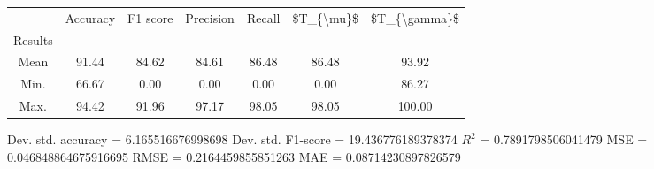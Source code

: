 \begin{tabular}{|c|c|c|c|c|c|c|}
\toprule
{} &  Accuracy &  F1 score &  Precision &  Recall &  \$T\_\{\textbackslash mu\}\$ &  \$T\_\{\textbackslash gamma\}\$ \\
Results &           &           &            &         &            &               \\
\hline
Mean    &     91.44 &     84.62 &      84.61 &   86.48 &      86.48 &         93.92 \\
Min.    &     66.67 &      0.00 &       0.00 &    0.00 &       0.00 &         86.27 \\
Max.    &     94.42 &     91.96 &      97.17 &   98.05 &      98.05 &        100.00 \\
\bottomrule
\end{tabular}

 Dev. std. accuracy = 6.165516676998698
 Dev. std. F1-score = 19.436776189378374
 $R^2$ = 0.7891798506041479
 MSE = 0.046848864675916695
 RMSE = 0.2164459855851263
 MAE = 0.08714230897826579